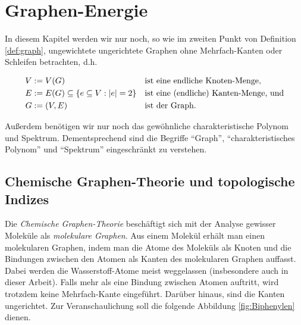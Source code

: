 \chapter{Graphen-Energie}

    In diesem Kapitel werden wir nur noch, so wie im zweiten Punkt von Definition \ref{def:graph}, ungewichtete ungerichtete Graphen ohne Mehrfach-Kanten oder Schleifen betrachten, d.h.

    \begin{align*}
        V & := V(G)                                            && \text{ist eine endliche Knoten-Menge,} \\
        E & := E(G) \subseteq {\left \{ e \subseteq V: |e| = 2 \right \}} && \text{ist eine (endliche) Kanten-Menge, und} \\
        G & := (V, E)                                          && \text{ist der Graph.}
    \end{align*}

    Außerdem benötigen wir nur noch das gewöhnliche charakteristische Polynom und Spektrum.
    Dementsprechend sind die Begriffe \enquote{Graph}, \enquote{charakteristisches Polynom} und \enquote{Spektrum} eingeschränkt zu verstehen.


    \section{Chemische Graphen-Theorie und topologische Indizes}

        Die \textit{Chemische Graphen-Theorie} beschäftigt sich mit der Analyse gewisser Moleküle als \textit{molekulare Graphen}.
        Aus einem Molekül erhält man einen molekularen Graphen, indem man die Atome des Moleküls als Knoten und die Bindungen zwischen den Atomen als Kanten des molekularen Graphen auffasst.
        Dabei werden die Wasserstoff-Atome meist weggelassen (insbesondere auch in dieser Arbeit).
        Falls mehr als eine Bindung zwischen Atomen auftritt, wird trotzdem keine Mehrfach-Kante eingeführt.
        Darüber hinaus, sind die Kanten ungerichtet.
        Zur Veranschaulichung soll die folgende Abbildung \ref{fig:Biphenylen} dienen.

